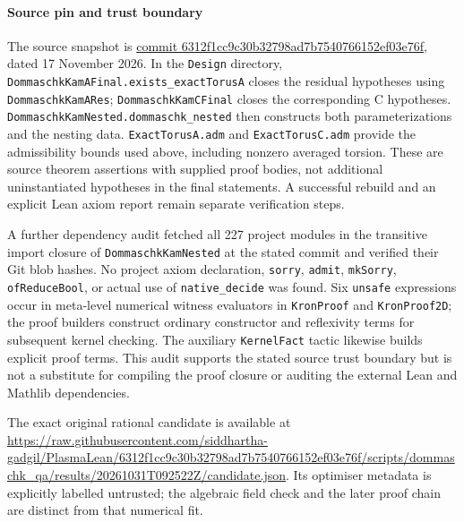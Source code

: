 \paragraph{Source pin and trust boundary}\label{source-pin-and-trust-boundary}

The source snapshot is \href{https://github.com/siddhartha-gadgil/PlasmaLean/commit/6312f1cc9c30b32798ad7b7540766152ef03e76f}{commit 6312f1cc9c30b32798ad7b7540766152ef03e76f}, dated 17 November 2026. In the \texttt{Design} directory, \texttt{DommaschkKamAFinal.exists\_exactTorusA} closes the residual hypotheses using \texttt{DommaschkKamARes}; \texttt{DommaschkKamCFinal} closes the corresponding C hypotheses. \texttt{DommaschkKamNested.dommaschk\_nested} then constructs both parameterizations and the nesting data. \texttt{ExactTorusA.adm} and \texttt{ExactTorusC.adm} provide the admissibility bounds used above, including nonzero averaged torsion. These are source theorem assertions with supplied proof bodies, not additional uninstantiated hypotheses in the final statements. A successful rebuild and an explicit Lean axiom report remain separate verification steps.

A further dependency audit fetched all 227 project modules in the transitive import closure of \texttt{DommaschkKamNested} at the stated commit and verified their Git blob hashes. No project axiom declaration, \texttt{sorry}, \texttt{admit}, \texttt{mkSorry}, \texttt{ofReduceBool}, or actual use of \texttt{native\_decide} was found. Six \texttt{unsafe} expressions occur in meta-level numerical witness evaluators in \texttt{KronProof} and \texttt{KronProof2D}; the proof builders construct ordinary constructor and reflexivity terms for subsequent kernel checking. The auxiliary \texttt{KernelFact} tactic likewise builds explicit proof terms. This audit supports the stated source trust boundary but is not a substitute for compiling the proof closure or auditing the external Lean and Mathlib dependencies.


The exact original rational candidate is available at \url{https://raw.githubusercontent.com/siddhartha-gadgil/PlasmaLean/6312f1cc9c30b32798ad7b7540766152ef03e76f/scripts/dommaschk_qa/results/20261031T092522Z/candidate.json}. Its optimiser metadata is explicitly labelled untrusted; the algebraic field check and the later proof chain are distinct from that numerical fit.
